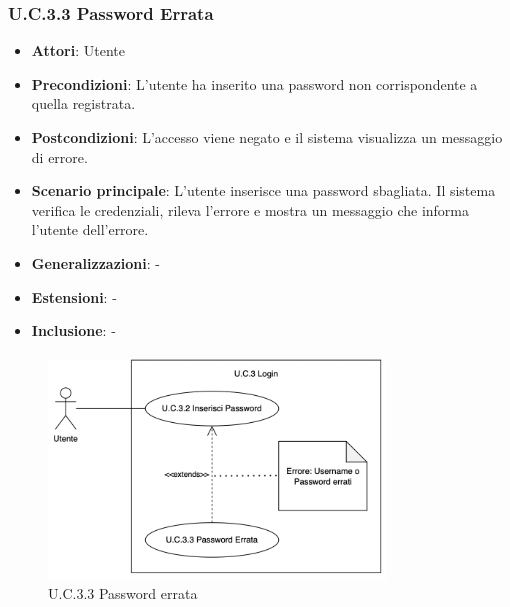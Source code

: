\subsubsection{U.C.3.3 Password Errata}
\begin{itemize}
    \item \textbf{Attori}: Utente
    \item \textbf{Precondizioni}: L'utente ha inserito una password non corrispondente a quella registrata.
    \item \textbf{Postcondizioni}: L'accesso viene negato e il sistema visualizza un messaggio di errore.
    \item \textbf{Scenario principale}: L'utente inserisce una password sbagliata. Il sistema verifica le credenziali, rileva l'errore e mostra un messaggio che informa l'utente dell'errore.
    \item \textbf{Generalizzazioni}: -
    \item \textbf{Estensioni}: -
    \item \textbf{Inclusione}: -
\end{itemize}
\begin{figure}[H]
    \centering
    \includegraphics[width=0.8\textwidth]{img/U.C.3.3.png}
    \caption{U.C.3.3 Password errata}
\end{figure}
\newpage
